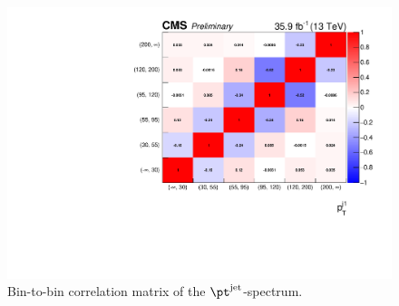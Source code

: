 \begin{figure}[hbtp]
  \begin{center}
    \includegraphics[width=\cmsFigWidth]{img/correlationMatrices/corrMat_CORRMAT_combinedCard_PTJ_smH_Nov28_MultiDimFit_mH125.pdf}
    \caption{
        Bin-to-bin correlation matrix of the $\ptjet$-spectrum.
        }
    \label{fig:corrMat_ptjet}
  \end{center}
\end{figure}

